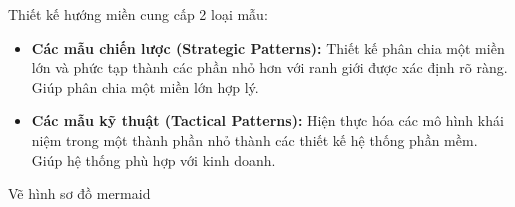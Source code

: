 Thiết kế hướng miền cung cấp 2 loại mẫu:

\begin{itemize}

\item \textbf{Các mẫu chiến lược (Strategic Patterns):} Thiết kế phân chia một miền lớn và phức tạp thành các phần nhỏ hơn với ranh giới được xác định rõ ràng. Giúp phân chia một miền lớn hợp lý.

\item \textbf{Các mẫu kỹ thuật (Tactical Patterns):} Hiện thực hóa các mô hình khái niệm trong một thành phần nhỏ thành các thiết kế hệ thống phần mềm. Giúp hệ thống phù hợp với kinh doanh.

\end{itemize} 


Vẽ hình sơ đồ mermaid 
